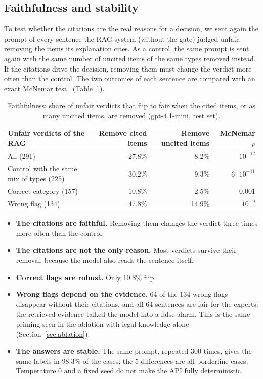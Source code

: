 \subsection{Faithfulness and stability}

To test whether the citations are the real reasons for a decision, we sent again the prompt of every sentence the RAG system (without the gate) judged unfair, removing the items its explanation cites. As a control, the same prompt is sent again with the same number of uncited items of the same types removed instead. If the citations drive the decision, removing them must change the verdict more often than the control. The two outcomes of each sentence are compared with an exact McNemar test~\citep{mcnemar1947} (Table~\ref{tab:faithfulness}).

\begin{table}[ht]
\centering\small
\caption{Faithfulness: share of unfair verdicts that flip to fair when the cited items, or as many uncited items, are removed (gpt-4.1-mini, test set).}
\label{tab:faithfulness}
\begin{tabular}{@{}lrrr@{}}
\toprule
Unfair verdicts of the RAG & Remove cited items & Remove uncited items & McNemar $p$ \\
\midrule
All (291) & 27.8\% & 8.2\% & $10^{-12}$ \\
Control with the same mix of types (225) & 30.2\% & 9.3\% & $6\cdot10^{-11}$ \\
Correct category (157) & 10.8\% & 2.5\% & 0.001 \\
Wrong flag (134) & 47.8\% & 14.9\% & $10^{-9}$ \\
\bottomrule
\end{tabular}
\end{table}

\begin{itemize}
  \item \textbf{The citations are faithful.} Removing them changes the verdict three times more often than the control.
  \item \textbf{The citations are not the only reason.} Most verdicts survive their removal, because the model also reads the sentence itself.
  \item \textbf{Correct flags are robust.} Only 10.8\% flip.
  \item \textbf{Wrong flags depend on the evidence.} 64 of the 134 wrong flags disappear without their citations, and all 64 sentences are fair for the experts: the retrieved evidence talked the model into a false alarm. This is the same priming seen in the ablation with legal knowledge alone (Section~\ref{sec:ablation}).
  \item \textbf{The answers are stable.} The same prompt, repeated 300 times, gives the same labels in 98.3\% of the cases; the 5 differences are all borderline cases. Temperature 0 and a fixed seed do not make the API fully deterministic.
\end{itemize}

